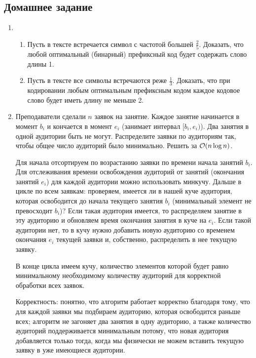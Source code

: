 \subsection{Домашнее задание}
\begin{enumerate}
  \item
    \begin{enumerate}
      \item
        Пусть в тексте встречается символ с частотой большей $\frac{2}{5}$.
        Доказать, что любой оптимальный (бинарный) префиксный код будет содержать слово длины 1.

      \item
        Пусть в тексте все символы встречаются реже $\frac{1}{3}$.
        Доказать, что при кодировании любым оптимальным префиксным кодом каждое кодовое слово 
        будет иметь длину не меньше 2.
    \end{enumerate}

  \item
 	Преподаватели сделали $n$ заявок на занятие. Каждое
 	занятие начинается в момент $b_i$ и кончается в момент $e_i$
 	(занимает интервал $[b_i, e_i)$). Два занятия в одной аудитории
 	быть не могут. Распределите заявки по аудиториям так, чтобы
 	общее число аудиторий было минимально. Решить за $\mathcal{O}(n \log n)$.
    \begin{solution}
        Для начала отсортируем по возрастанию заявки по времени начала занятий $b_i$. Для отслеживания времени освобождения аудиторий от занятий (окончания занятий $e_i$) для каждой аудитории можно использовать минкучу. Дальше в цикле по всем заявкам: проверяем, имеется ли в нашей куче аудитория, которая освободится до начала текущего занятия $b_i$ (минимальный элемент не превосходит $b_i$)? Если такая аудитория имеется, то распределяем занятие в эту аудиторию и обновляем время окончания занятия в куче на $e_i$. Если такой аудитории нет, то в кучу нужно добавить новую аудиторию со временем окончания $e_i$ текущей заявки и, собственно, распределить в нее текущую заявку.
        
        В конце цикла имеем кучу, количество элементов которой будет равно минимальному необходимому количеству аудиторий для корректной обработки всех заявок.

        Корректность: понятно, что алгоритм работает корректно благодаря тому, что для каждой заявки мы подбираем аудиторию, которая освободится раньше всех; алгоритм не загоняет два занятия в одну аудиторию, а также количество аудиторий поддерживается минимальным потому, что новая аудитория добавляется только тогда, когда мы физически не можем вставить текущую заявку в уже имеющиеся аудитории.


\end{solution}
\end{enumerate}
